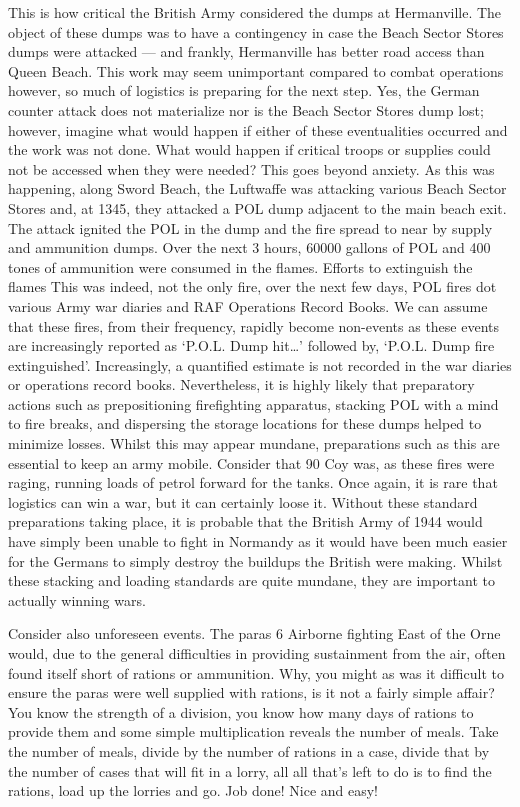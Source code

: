 \documentclass[noraggedright]{turabian-researchpaper}
\begin{document}
This is
how critical the British Army considered the dumps at Hermanville.  The 
object of these dumps was to have a contingency in case the Beach Sector 
Stores dumps were attacked --- and frankly, Hermanville has better road access
 than Queen Beach.  This work may seem unimportant compared to combat 
operations however, so much of logistics is preparing for the next step. 
Yes, the German counter attack does not materialize nor is the Beach Sector
Stores dump lost; however, imagine what would happen if either of these 
eventualities occurred and the work was not done.  What would happen if 
critical troops or supplies could not be accessed when they were needed?  
This goes beyond anxiety.  As this was happening, along Sword Beach, the 
Luftwaffe was attacking various Beach Sector Stores and, at 1345, they attacked
a POL dump adjacent to the main beach exit.  The attack ignited the POL in the
dump and the fire spread to near by supply and ammunition dumps.  Over the next 
3 hours, 60000 gallons of POL and 400 tones of ammunition were consumed in 
the flames.\autocite[8 June 1944]{1raf}  Efforts to extinguish the flames 
This was indeed, not the only fire, over the next few days, POL fires dot 
various Army war diaries and RAF Operations Record Books.  We can assume that
these fires, from their frequency, rapidly become non-events as these events
are increasingly reported as `P.O.L. Dump hit\ldots' followed by, `P.O.L. 
Dump fire extinguished'.\autocite[10 June 1944]{1raf}  Increasingly, a 
quantified estimate is not recorded in the war diaries or operations record
books.  Nevertheless, it is highly likely that preparatory actions such as
prepositioning firefighting apparatus, stacking POL with a mind to fire
breaks, and dispersing the storage locations for these dumps helped to minimize
losses.  Whilst this may appear mundane, preparations such as this are 
essential to keep an army mobile.  Consider that 90 Coy was, as these fires
were raging, running loads of petrol forward for the tanks.  Once again, it is
rare that logistics can win a war, but it can certainly loose it.  Without 
these standard preparations taking place, it is probable that the British 
Army of 1944 would have simply been unable to fight in Normandy as it would
have been much easier for the Germans to simply destroy the buildups the 
British were making.  Whilst these stacking and loading standards are quite 
mundane, they are important to actually winning wars.

Consider also unforeseen events.  The paras 6 Airborne fighting East of the 
Orne would, due to the general difficulties in providing sustainment from 
the air, often found itself short of rations or ammunition.  Why, you might as
was it difficult to ensure the paras were well supplied with rations, is it 
not a fairly simple affair?  You know the strength of a division, you know how
many days of rations to provide them and some simple multiplication reveals
the number of meals.  Take the number of meals, divide by the number of 
rations in a case, divide that by the number of cases that will fit in a 
lorry, all all that's left to do is to find the rations, load up the lorries 
and go.  Job done!  Nice and easy!
\end{document}
